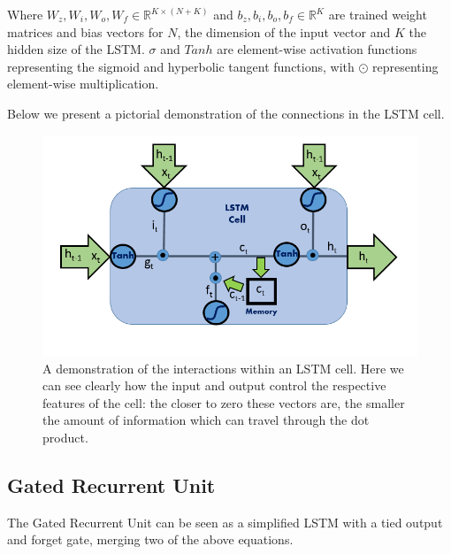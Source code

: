 \documentclass{article} %
\begin{document}
Where $W_{z}, W_{i}, W_{o}, W_{f} \in \mathbb{R}^{K \times(N+K)}$ and $b_{z}, b_{i}, b_{o}, b_{f} \in \mathbb{R}^{K}$ are trained weight matrices and bias vectors for $N$, the dimension of the input vector and $K$ the hidden size of the LSTM. $\sigma$ and $Tanh$ are element-wise activation functions representing the sigmoid and hyperbolic tangent functions, with $\odot$ representing element-wise multiplication. 

Below we present a pictorial demonstration of the connections in the LSTM cell. 

\begin{figure}[H]
\begin{center}
\includegraphics[width=0.8 \linewidth]{LSTM.png} 
\end{center}
\caption{A demonstration of the interactions within an LSTM cell. Here we can see clearly how the input and output control the respective features of the cell: the closer to zero these vectors are, the smaller the amount of information which can travel through the dot product.}
\end{figure}




\subsection{Gated Recurrent Unit}
\label{sec:nn/gru}

The Gated Recurrent Unit\cite{DBLP:journals/corr/ChungGCB15} can be seen as a simplified LSTM with a tied output and forget gate, merging two of the above equations. 
\end{document}
